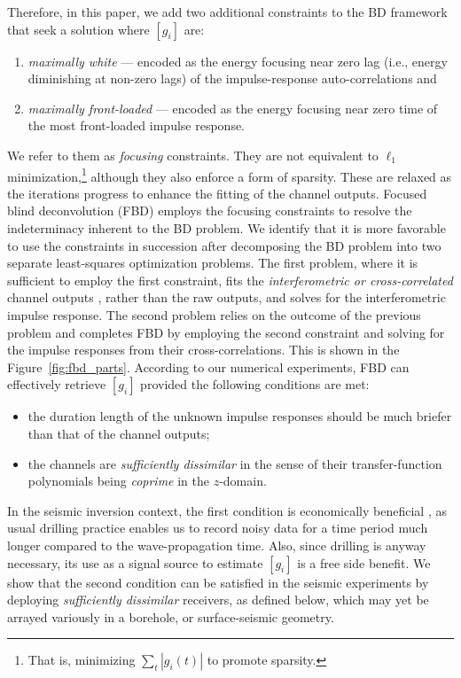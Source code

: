 \documentclass{article}
\theoremstyle{definition}
\def\vecc#1{[#1]}
\begin{document}
Therefore, in this paper, 
we add two additional constraints to the BD framework
that seek a solution where $\vecc{g_i}$ are:
%
\begin{enumerate}
\item
	\emph{maximally white}
		---
	encoded as the
	energy 
	focusing 
	near zero lag (i.e., energy diminishing at non-zero lags)
	of the impulse-response auto-correlations and 	
%
\item
	\emph{maximally front-loaded} ---
	encoded as the
	energy 
	focusing near zero time
	of the most front-loaded impulse response.	
\end{enumerate}
%
We refer to them as \emph{focusing} constraints. 
%
They are not equivalent to $\ell_1$ minimization,\footnote{That is, minimizing $\sum_t|g_i(t)|$ to promote sparsity.} although they also enforce a form of sparsity.
%
These are 
relaxed as the iterations progress to enhance the fitting of the channel outputs.
%
Focused blind deconvolution (FBD) 
employs the 
focusing constraints to resolve the indeterminacy inherent to the BD problem.
%
We identify that it is more 
favorable to use the constraints
in succession after 
decomposing the BD problem 
into two separate 
least-squares optimization problems.
%
The first problem, where it is sufficient to employ the first constraint,
fits the \emph{interferometric or cross-correlated} channel outputs \citep{bharadwajibd},
rather than the raw outputs, and solves for the interferometric impulse response.
%
The second problem relies on the outcome of the previous problem and 
completes FBD by employing the second constraint
and solving for the impulse responses from their cross-correlations.
%
This is shown in the Figure~\ref{fig:fbd_parts}.
%
According to
our numerical experiments, 
FBD
can effectively 
retrieve $\vecc{g_i}$
provided the following 
conditions are met:
%
\begin{itemize}
\item  
	the {duration} length of the unknown impulse responses
	should be much {briefer} than 
	{that of} the channel outputs;
\item  the channels are \emph{sufficiently dissimilar} in the sense of their 
	transfer-function polynomials being \emph{coprime} in the $z$-domain.
\end{itemize}
%
In the seismic inversion context, 
the first 
condition is {economically beneficial}%
, as {usual drilling practice enables us to }%
record noisy data for a time period
much longer compared to the wave-propagation time.
Also, since drilling is anyway necessary, its use as a signal source to estimate $\vecc{g_i}$ is a free side benefit.
%
We show that 
the second condition {can} be 
satisfied in the seismic experiments by deploying \emph{sufficiently dissimilar} receivers, as defined below, 
which may yet be arrayed variously in a borehole, or surface-seismic geometry.
%
\end{document}
